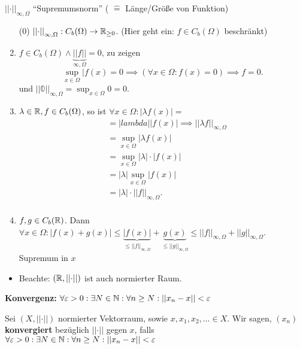 $ \left|\left| \cdot  \right|\right|_{\infty, \Omega} $ ``Supremumsnorm'' ( $ \widehat{=} $ Länge/Größe von Funktion)

\begin{enumerate}[label=(\roman*)]
	\item[(0)] $ \left|\left| \cdot  \right|\right|_{\infty, \Omega} : C_b(\Omega) \to  \mathbb{R}_{\geq 0} $. (Hier geht ein: $ f \in C_b(\Omega) $ beschränkt)
\item $ f \in C_b(\Omega) \wedge \underbrace{\left|\left| f \right|\right|}_{\infty, \Omega} = 0 $, zu zeigen 
		\[
			\sup_{x \in \Omega} | f(x) = 0 \implies (\forall x \in  \Omega : f(x) = 0) \implies f = 0.
		\]
		und $ \left|\left| \mathbb{0} \right|\right|_{\infty, \Omega} = \sup_{x \in \Omega} 0 = 0 $.
	\item $ \lambda \in \mathbb{R} , f \in C_b(\Omega) $, so ist $ \forall x \in \Omega : | \lambda f(x) | =  $ 
		\begin{align*}
			~&= |lambda| |f(x)| \implies  \left|\left| \lambda f \right|\right|_{\infty, \Omega} \\
			~&= \sup_{x\in \Omega} | \lambda f (x) | \\
			~&= \sup_{x \in \Omega} |\lambda| \cdot |f(x)| \\
			~&= |\lambda| \sup_{x \in \Omega} |f(x)| \\
			~&= |\lambda| \cdot \left|\left| f \right|\right|_{\infty, \Omega}. \\
		\end{align*}
	\item $ f, g \in  C_b(\mathbb{R} ) $. Dann $ \forall x \in \Omega: | f(x) + g(x) | \leq \underbrace{|f(x)|}_{\leq \left|\left| f \right|\right|_{\infty, \Omega}} + \underbrace{g(x)}_{\leq \left|\left| g \right|\right|_{\infty, \Omega}} \leq \left|\left| f \right|\right|_{\infty, \Omega} + \left|\left| g \right|\right|_{\infty, \Omega} $. Supremum in $ x $
\end{enumerate}

\begin{itemize}
	\item Beachte: $ (\mathbb{R} , \left|\left| \cdot  \right|\right|)  $ ist auch normierter Raum.
\end{itemize}
\textbf{Konvergenz:} $ \forall \varepsilon > 0 : \exists N \in  \mathbb{N}  : \forall n \geq N : \left|\left| x_n - x \right|\right| < \varepsilon  $ 

\begin{subdefinition}
	Sei $ (X, \left|\left| \cdot  \right|\right| ) $ normierter Vektorraum, sowie $ x, x_1, x_2, \dotsc \in X $. Wir sagen, $ (x_n) $ \textbf{konvergiert} bezüglich $ \left|\left| \cdot  \right|\right|  $ gegen $ x $, falls $ \forall \varepsilon > 0: \exists N \in \mathbb{N} : \forall n \geq N : \left|\left| x_n - x  \right|\right| < \varepsilon $
\end{subdefinition}

